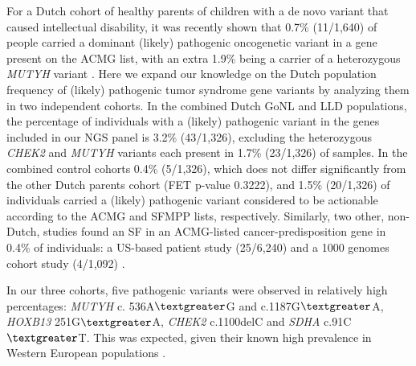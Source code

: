 For a Dutch cohort of healthy parents of children with a de novo variant that caused intellectual disability, it was recently shown that 0.7\% (11/1,640) of people carried a dominant (likely) pathogenic oncogenetic variant in a gene present on the ACMG list, with an extra 1.9\% being a carrier of a heterozygous \textsl{MUTYH} variant \cite{Haer_Wigman_2018}. 
Here we expand our knowledge on the Dutch population frequency of (likely) pathogenic tumor syndrome gene variants by analyzing them in two independent cohorts. 
In the combined Dutch GoNL and LLD populations, the percentage of individuals with a (likely) pathogenic variant in the genes included in our NGS panel is 3.2\% (43/1,326), excluding the heterozygous \textsl{CHEK2} and \textsl{MUTYH} variants each present in 1.7\% (23/1,326) of samples. 
In the combined control cohorts 0.4\% (5/1,326), which does not differ significantly from the other Dutch parents cohort (FET p-value 0.3222), and 1.5\% (20/1,326) of individuals carried a (likely) pathogenic variant considered to be actionable according to the ACMG and SFMPP lists, respectively. Similarly, two other, non-Dutch, studies found an SF in an ACMG-listed cancer-predisposition gene in 0.4\% of individuals: a US-based patient study (25/6,240) \cite{Hart_2018} and a 1000 genomes cohort study (4/1,092) \cite{Olfson_2015}.  

In our three cohorts, five pathogenic variants were observed in relatively high percentages: \textsl{MUTYH} c. 536A$\textgreater$G and c.1187G$\textgreater$A, \textsl{HOXB13} 251G$\textgreater$A, \textsl{CHEK2} c.1100delC and \textsl{SDHA} c.91C$\textgreater$T. 
This was expected, given their known high prevalence in Western European populations \cite{Aretz_2013,Apostolou_2017,Liu_2016b,Oudijk_2012}. 


